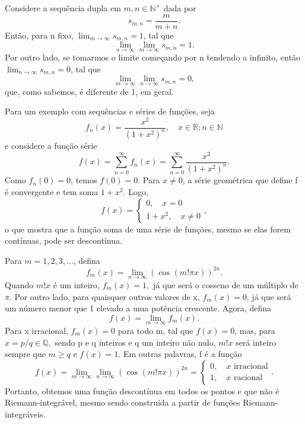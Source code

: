 \documentclass[../analysis_notes.tex]{subfiles}
\begin{document}
\begin{example}
	Considere a sequência dupla em \(m, n\in \mathbb{N}^{\times}\) dada por
	\[
		s_{m, n}=\frac{m}{m+n}.
	\]
	Então, para n fixo, \(\lim_{m\to \infty}s_{m, n}=1\), tal que
	\[
		\lim_{n\to \infty}\lim_{m\to \infty}s_{m, n}=1.
	\]
	Por outro lado, se tomarmos o limite começando por n tendendo a infinito, então \(\lim_{n\to \infty}s_{m, n}=0\), tal que
	\[
		\lim_{m\to \infty}\lim_{n\to \infty}s_{m, n}= 0,
	\]
	que, como sabemos, é diferente de 1, em geral.
\end{example}
\begin{example}
	Para um exemplo com sequências e séries de funções, seja
	\[
		f_{n}(x)=\frac{x^{2}}{(1+x^{2})^{n}},\quad x\in \mathbb{R}; n\in \mathbb{N}
	\]
	e considere a função série
	\[
		f(x)=\sum\limits_{n=0}^{\infty}f_{n}(x)=\sum\limits_{n=0}^{\infty}\frac{x^{2}}{(1+x^{2})^{n}}.
	\]
	Como \(f_{n}(0)=0\), temos \(f(0)=0.\) Para \(x\neq 0\), a série geométrica que define f é convergente e tem soma \(1+x^{2}.\) Logo,
	\[
		f(x) = \left\{\begin{array}{ll}
			0, \quad x=0 \\
			1+x^{2},\quad x\neq0
		\end{array}\right.,
	\]
	o que mostra que a função soma de uma série de funções, mesmo se elas forem contínuas, pode ser descontínua.
\end{example}
\begin{example}
	Para \(m=1,2,3,\dotsc \), defina
	\[
		f_{m}(x)=\lim_{n\to \infty}(\cos^{}{(m!\pi x)})^{2n}.
	\]
	Quando \(m!x\) é um inteiro, \(f_{m}(x)=1,\) já que será o cosseno de um múltiplo de \(\pi \). Por outro lado, para quaisquer outros valores de x, \(f_{m}(x)=0\), já que será um número menor que 1 elevado a uma potência crescente. Agora, defina
	\[
		f(x)=\lim_{m\to \infty}f_{m}(x).
	\]
	Para x irracional, \(f_{m}(x)=0\) para todo m, tal que \(f(x)=0\), mas, para \(x=p/q\in \mathbb{Q},\) sendo p e q inteiros e q um inteiro não nulo, \(m!x\) será inteiro sempre que \(m\geq q\) e \(f(x)=1\). Em outras palavras, f é a função
	\[
		f(x)=\lim_{m\to \infty}\lim_{n\to \infty}(\cos^{}{(m!\pi x)})^{2n}  = \left\{\begin{array}{ll}
			0,\quad x \text{ irracional} \\
			1,\quad x \text{ racional}
		\end{array}\right..
	\]
	Portanto, obtemos uma função descontínua em todos os pontos e que não é Riemann-integrável, mesmo sendo construída a partir de funções Riemann-integráveis.
\end{example}
\end{document}
